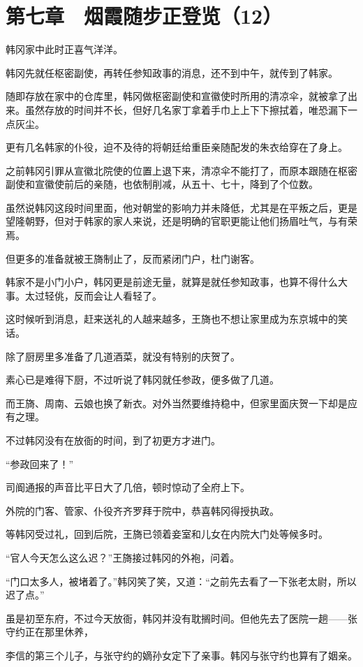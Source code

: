 \section{第七章　烟霞随步正登览（12）}

韩冈家中此时正喜气洋洋。

韩冈先就任枢密副使，再转任参知政事的消息，还不到中午，就传到了韩家。

随即存放在家中的仓库里，韩冈做枢密副使和宣徽使时所用的清凉伞，就被拿了出来。虽然存放的时间并不长，但好几名家丁拿着手巾上上下下擦拭着，唯恐漏下一点灰尘。

更有几名韩家的仆役，迫不及待的将朝廷给重臣亲随配发的朱衣给穿在了身上。

之前韩冈引罪从宣徽北院使的位置上退下来，清凉伞不能打了，而原本跟随在枢密副使和宣徽使前后的亲随，也依制削减，从五十、七十，降到了个位数。

虽然说韩冈这段时间里面，他对朝堂的影响力并未降低，尤其是在平叛之后，更是望隆朝野，但对于韩家的家人来说，还是明确的官职更能让他们扬眉吐气，与有荣焉。

但更多的准备就被王旖制止了，反而紧闭门户，杜门谢客。

韩家不是小门小户，韩冈更是前途无量，就算是就任参知政事，也算不得什么大事。太过轻佻，反而会让人看轻了。

这时候听到消息，赶来送礼的人越来越多，王旖也不想让家里成为东京城中的笑话。

除了厨房里多准备了几道酒菜，就没有特别的庆贺了。

素心已是难得下厨，不过听说了韩冈就任参政，便多做了几道。

而王旖、周南、云娘也换了新衣。对外当然要维持稳中，但家里面庆贺一下却是应有之理。

不过韩冈没有在放衙的时间，到了初更方才进门。

“参政回来了！”

司阍通报的声音比平日大了几倍，顿时惊动了全府上下。

外院的门客、管家、仆役齐齐罗拜于院中，恭喜韩冈得授执政。

等韩冈受过礼，回到后院，王旖已领着妾室和儿女在内院大门处等候多时。

“官人今天怎么这么迟？”王旖接过韩冈的外袍，问着。

“门口太多人，被堵着了。”韩冈笑了笑，又道：“之前先去看了一下张老太尉，所以迟了点。”

虽是初至东府，不过今天放衙，韩冈并没有耽搁时间。但他先去了医院一趟——张守约正在那里休养，

李信的第三个儿子，与张守约的嫡孙女定下了亲事。韩冈与张守约也算有了姻亲。

